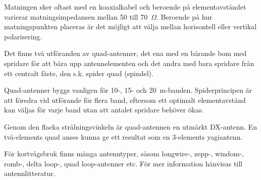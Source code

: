 Matningen sker oftast med en koaxialkabel och beroende på elementavståndet
varierar matningsimpedansen mellan 50 till 70~\(\Omega\).
Beroende på hur matningspunkten placeras är det möjligt att välja mellan
horisontell eller vertikal polarisering.

Det finns två utföranden av quad-antenner, det ena med en bärande bom
med spridare för att bära upp antennelementen och det andra med bara
spridare från ett centralt fäste, den s.k. spider quad (spindel).

Quad-antenner byggs vanligen för 10-, 15- och 20~m-banden.
Spiderprincipen är att föredra vid utförande för flera band, eftersom ett
optimalt elementavstånd kan väljas för varje band utan att antalet spridare
behöver ökas.

Genom den flacka strålningsvinkeln är quad-antennen en utmärkt DX-antenn.
En två-elements quad anses kunna ge ett resultat som en 3-elements yagiantenn.

För kortvågsbruk finns många antenntyper, såsom longwire-, zepp-,
windom-, romb-, delta loop-, quad loop-antenner etc. För mer
information hänvisas till antennlitteratur.

